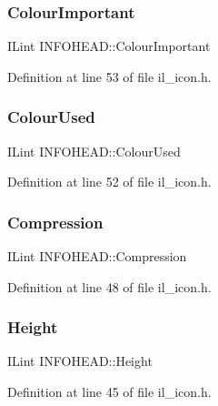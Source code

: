 \subsubsection{\texorpdfstring{Colour\+Important}{ColourImportant}}
{\footnotesize\ttfamily I\+Lint I\+N\+F\+O\+H\+E\+A\+D\+::\+Colour\+Important}



Definition at line 53 of file il\+\_\+icon.\+h.

\mbox{\label{structINFOHEAD_a7960c11e635c435487520f220f837bf6}} 
\subsubsection{\texorpdfstring{Colour\+Used}{ColourUsed}}
{\footnotesize\ttfamily I\+Lint I\+N\+F\+O\+H\+E\+A\+D\+::\+Colour\+Used}



Definition at line 52 of file il\+\_\+icon.\+h.

\mbox{\label{structINFOHEAD_aae2b452d670d2c1abb0250d6f23e1a1a}} 
\subsubsection{\texorpdfstring{Compression}{Compression}}
{\footnotesize\ttfamily I\+Lint I\+N\+F\+O\+H\+E\+A\+D\+::\+Compression}



Definition at line 48 of file il\+\_\+icon.\+h.

\mbox{\label{structINFOHEAD_a184c597278db7cf5929997e9466697cc}} 
\subsubsection{\texorpdfstring{Height}{Height}}
{\footnotesize\ttfamily I\+Lint I\+N\+F\+O\+H\+E\+A\+D\+::\+Height}



Definition at line 45 of file il\+\_\+icon.\+h.

